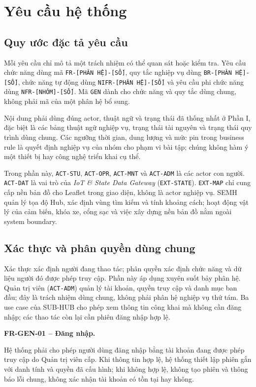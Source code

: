 \clearpage
\section{Yêu cầu hệ thống}

\subsection{Quy ước đặc tả yêu cầu}

Mỗi yêu cầu chỉ mô tả một trách nhiệm có thể quan sát hoặc kiểm tra. Yêu cầu chức năng dùng mã \texttt{FR-[PHÂN HỆ]-[SỐ]}, quy tắc nghiệp vụ dùng \texttt{BR-[PHÂN HỆ]-[SỐ]}, chức năng tự động dùng \texttt{NIFR-[PHÂN HỆ]-[SỐ]} và yêu cầu phi chức năng dùng \texttt{NFR-[NHÓM]-[SỐ]}. Mã \texttt{GEN} dành cho chức năng và quy tắc dùng chung, không phải mã của một phân hệ bổ sung.

Nội dung phải dùng đúng actor, thuật ngữ và trạng thái đã thống nhất ở Phần I, đặc biệt là các bảng thuật ngữ nghiệp vụ, trạng thái tài nguyên và trạng thái quy trình dùng chung. Các ngưỡng thời gian, dung lượng và mức pin trong business rule là quyết định nghiệp vụ của nhóm cho phạm vi bài tập; chúng không hàm ý một thiết bị hay công nghệ triển khai cụ thể.

Trong phần này, \texttt{ACT-STU}, \texttt{ACT-OPR}, \texttt{ACT-MNT} và \texttt{ACT-ADM} là các actor con người. \texttt{ACT-DAT} là vai trò của \textit{IoT \& State Data Gateway} (\texttt{EXT-STATE}). \texttt{EXT-MAP} chỉ cung cấp nền bản đồ cho Leaflet trong giao diện, không là actor nghiệp vụ. SEMH quản lý tọa độ Hub, xác định vùng tìm kiếm và tính khoảng cách; hoạt động vật lý của cảm biến, khóa xe, cổng sạc và việc xây dựng nền bản đồ nằm ngoài system boundary.

\subsection{Xác thực và phân quyền dùng chung}
\label{sec:common-access}

Xác thực xác định người đang thao tác; phân quyền xác định chức năng và dữ liệu người đó được phép truy cập. Phần này áp dụng xuyên suốt bảy phân hệ. Quản trị viên (\texttt{ACT-ADM}) quản lý tài khoản, quyền truy cập và danh mục ban đầu; đây là trách nhiệm dùng chung, không phải phân hệ nghiệp vụ thứ tám. Ba use case của SUB-HUB cho phép xem thông tin công khai mà không cần đăng nhập; các thao tác còn lại cần phiên đăng nhập hợp lệ.

\noindent\textbf{FR-GEN-01 -- Đăng nhập.}\par
\nopagebreak[4]
Hệ thống phải cho phép người dùng đăng nhập bằng tài khoản đang được phép truy cập do Quản trị viên cấp. Khi thông tin hợp lệ, hệ thống thiết lập phiên gắn với danh tính và quyền đã cấu hình; khi không hợp lệ, không tạo phiên và thông báo lỗi chung, không xác nhận tài khoản có tồn tại hay không.

